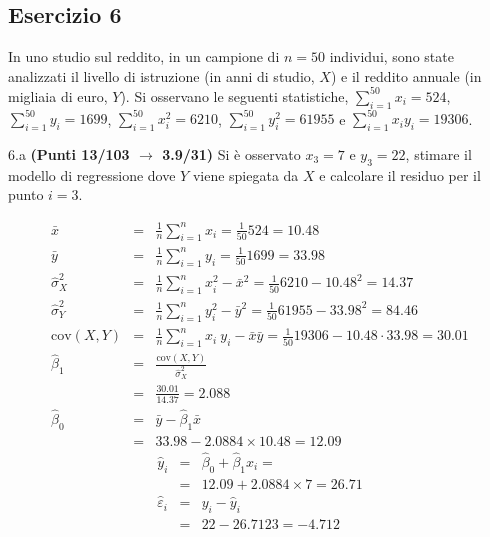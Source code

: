 \documentclass[
  11pt,
]{book}
\theoremstyle{mytheoremstyle}
\theoremstyle{mydefstyle}
\newenvironment{sol}
  {
  \begin{tcolorbox}[enhanced,breakable,arc=0.1mm,boxrule=1pt,colback=white,colframe=iblue,
  title=\bf \fontfamily{lmss}\selectfont \hspace{.5 cm} Soluzione,drop fuzzy shadow]

}{
\end{tcolorbox}
  }
\begin{document}
\subsection{Esercizio 6}\label{esercizio-6-30}

In uno studio sul reddito, in un campione di \(n=50\) individui, sono state analizzati il livello di istruzione (in anni di studio, \(X\)) e il reddito annuale (in migliaia di euro, \(Y\)).
Si osservano le seguenti statistiche, \(\sum_{i=1}^{50}x_i=524\), \(\sum_{i=1}^{50}y_i=1699\),
\(\sum_{i=1}^{50}x_i^2=6210\), \(\sum_{i=1}^{50}y_i^2=61955\) e \(\sum_{i=1}^{50}x_iy_i=19306\).

6.a \textbf{(Punti 13/103 \(\rightarrow\) 3.9/31)} Si è osservato \(x_3=7\) e \(y_3=22\), stimare il modello di regressione dove \(Y\) viene spiegata da \(X\) e calcolare il residuo per il punto \(i=3\).

\begin{sol}
\begin{eqnarray*}
           \bar x &=&\frac 1 n\sum_{i=1}^n x_i = \frac {1}{ 50 }  524 =  10.48 \\
           \bar y &=&\frac 1 n\sum_{i=1}^n y_i = \frac {1}{ 50 }  1699 =  33.98 \\
           \hat\sigma_X^2&=&\frac 1 n\sum_{i=1}^n x_i^2-\bar x^2=\frac {1}{ 50 }  6210  - 10.48 ^2= 14.37 \\
           \hat\sigma_Y^2&=&\frac 1 n\sum_{i=1}^n y_i^2-\bar y^2=\frac {1}{ 50 }  61955  - 33.98 ^2= 84.46 \\
           \text{cov}(X,Y)&=&\frac 1 n\sum_{i=1}^n x_i~y_i-\bar x\bar y=\frac {1}{ 50 }  19306 - 10.48 \cdot 33.98 = 30.01 \\
           \hat\beta_1 &=& \frac{\text{cov}(X,Y)}{\hat\sigma_X^2} \\
                    &=& \frac{ 30.01 }{ 14.37 }  =  2.088 \\
           \hat\beta_0 &=& \bar y - \hat\beta_1 \bar x\\
                    &=&  33.98 - 2.0884 \times  10.48 = 12.09 
         \end{eqnarray*}\begin{eqnarray*}
\hat y_i &=&\hat\beta_0+\hat\beta_1 x_i=\\ 
&=& 12.09 + 2.0884 \times 7 = 26.71 \\ 
\hat \varepsilon_i &=& y_i-\hat y_i\\ 
&=& 22 - 26.7123 = -4.712  
\end{eqnarray*}

\end{sol}
\end{document}
